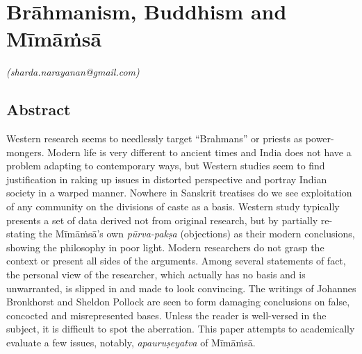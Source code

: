 
\chapter{Brāhmanism, Buddhism and Mīmāṁsā}\label{chapter6}



\begin{flushright}
\textit{(sharda.narayanan@gmail.com)}
\end{flushright}


\vspace{.2cm}

\section*{Abstract}

Western research seems to needlessly target “Brahmans” or priests as power-mongers. Modern life is very different to ancient times and India does not have a problem adapting to contemporary ways, but Western studies seem to find justification in raking up issues in distorted perspective and portray Indian society in a warped manner. Nowhere in Sanskrit treatises do we see exploitation of any community on the divisions of caste as a basis. Western study typically presents a set of data derived not from original research, but by partially re-stating the Mīmāṁsā’s own \textit{pūrva-pakṣa} (objections) as their modern conclusions, showing the philosophy in poor light. Modern researchers do not grasp the context or present all sides of the arguments. Among several statements of fact, the personal view of the researcher, which actually has no basis and is unwarranted, is slipped in and made to look convincing. The writings of Johannes Bronkhorst and Sheldon Pollock are seen to form damaging conclusions on false, concocted and misrepresented bases. Unless the reader is well-versed in the subject, it is difficult to spot the aberration. This paper attempts to academically evaluate a few issues, notably, \textit{apauruṣeyatva} of Mīmāṁsā.

